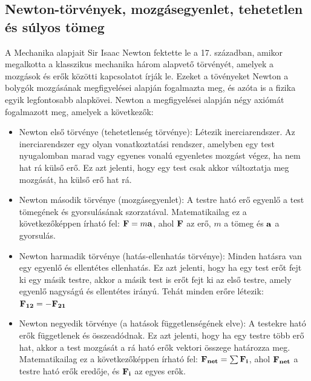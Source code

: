 \documentclass[../main.tex]{subfiles}
\begin{document}
\subsection{Newton-törvények, mozgásegyenlet, tehetetlen és súlyos tömeg}
A Mechanika alapjait Sir Isaac Newton fektette le a 17. században, amikor megalkotta a klasszikus mechanika három alapvető törvényét, amelyek a mozgások és erők közötti kapcsolatot írják le. Ezeket a tövényeket Newton a bolygók mozgásának megfigyelései alapján fogalmazta meg,
és azóta is a fizika egyik legfontosabb alapkövei. Newton a megfigyelései alapján négy axiómát fogalmazott meg, amelyek a következők:
\begin{itemize}
    \item Newton első törvénye (tehetetlenség törvénye): Létezik inerciarendszer. Az inerciarendszer egy olyan vonatkoztatási rendszer, amelyben egy test nyugalomban marad vagy egyenes vonalú egyenletes mozgást végez, ha nem hat rá külső erő. Ez azt jelenti, hogy egy test csak akkor változtatja meg mozgását, ha külső erő hat rá.
    \item Newton második törvénye (mozgásegyenlet): A testre ható erő egyenlő a test tömegének és gyorsulásának szorzatával. Matematikailag ez a következőképpen írható fel: $\bold{F} = m\bold{a}$, ahol $\bold{F}$ az erő, $m$ a tömeg és $\bold{a}$ a gyorsulás.
    \item Newton harmadik törvénye (hatás-ellenhatás törvénye): Minden hatásra van egy egyenlő és ellentétes ellenhatás. Ez azt jelenti, hogy ha egy test erőt fejt ki egy másik testre, akkor a másik test is erőt fejt ki az első testre, amely egyenlő nagyságú és ellentétes irányú. Tehát minden erőre létezik: $\bold{F_{12}} = - \bold{F_{21}}$
    \item Newton negyedik törvénye (a hatások függetlenségének elve): A testekre ható erők függetlenek és összeadódnak. Ez azt jelenti, hogy ha egy testre több erő hat, akkor a test mozgását a rá ható erők vektori összege határozza meg. Matematikailag ez a következőképpen írható fel: $\bold{F_{net}} = \sum \bold{F_i}$, ahol $\bold{F_{net}}$ a testre ható erők eredője, és $\bold{F_i}$ az egyes erők.
\end{itemize}
\end{document}

